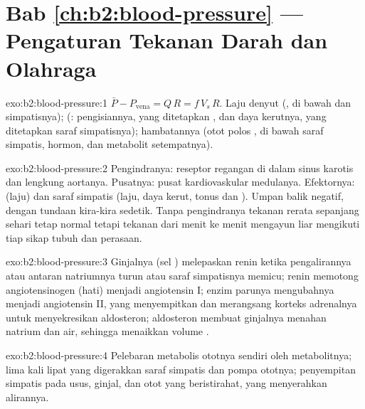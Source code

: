\section*{Bab \ref{ch:b2:blood-pressure} --- Pengaturan Tekanan Darah dan Olahraga}

\begin{solution}{exo:b2:blood-pressure:1}
$\bar P - P_{\text{vena}} = Q\,R = f\,V_s\,R$. Laju denyut 
(, di bawah  dan simpatisnya);  (: pengisiannya, yang ditetapkan , dan daya
kerutnya, yang ditetapkan saraf simpatisnya); hambatannya (otot polos
, di bawah saraf simpatis, hormon, dan metabolit
setempatnya).
\end{solution}

\begin{solution}{exo:b2:blood-pressure:2}
Pengindranya: reseptor regangan di dalam sinus karotis dan lengkung
aortanya. Pusatnya: pusat kardiovaskular medulanya. Efektornya:  (laju) dan saraf simpatis (laju, daya kerut, tonus  dan
). Umpan balik negatif, dengan tundaan kira-kira sedetik. Tanpa
pengindranya tekanan rerata sepanjang sehari tetap normal tetapi
tekanan dari menit ke menit mengayun liar mengikuti tiap sikap tubuh
dan perasaan.
\end{solution}

\begin{solution}{exo:b2:blood-pressure:3}
Ginjalnya (sel ) melepaskan renin ketika pengalirannya atau
antaran natriumnya turun atau saraf simpatisnya memicu; renin memotong
angiotensinogen (hati) menjadi angiotensin I; enzim parunya mengubahnya
menjadi angiotensin II, yang menyempitkan  dan merangsang
korteks adrenalnya untuk menyekresikan aldosteron; aldosteron membuat
ginjalnya menahan natrium dan air, sehingga menaikkan volume .
\end{solution}

\begin{solution}{exo:b2:blood-pressure:4}
Pelebaran metabolis  ototnya sendiri oleh metabolitnya;  lima kali lipat yang digerakkan saraf simpatis dan pompa
ototnya; penyempitan simpatis pada  usus, ginjal, dan otot yang
beristirahat, yang menyerahkan alirannya.
\end{solution}

